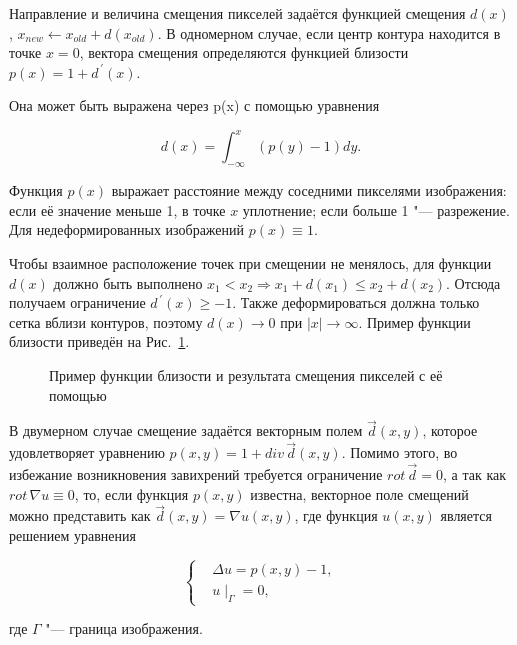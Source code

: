 Направление и величина смещения пикселей задаётся функцией смещения $d\left(x\right)$, $x_{new} \leftarrow x_{old}+d(x_{old})$. В одномерном случае, если центр контура находится в точке $x = 0$, вектора смещения определяются функцией близости $p\left(x\right)=1+d^{\,\prime}(x)$.

Она может быть выражена через p(x) с помощью уравнения

\begin{equation*}
	d\left(x\right)=\int_{-\infty}^{x}\left(p\left(y\right)-1\right)dy.
\end{equation*}

Функция $p(x)$ выражает расстояние между соседними пикселями изображения: если её значение меньше 1, в точке $x$ уплотнение; если больше 1 "--- разрежение. Для недеформированных изображений $p(x)\equiv1$.

Чтобы взаимное расположение точек при смещении не менялось, для функции $d(x)$ должно быть выполнено $x_1<x_2 \Rightarrow x_1+d(x_1)\le x_2+d(x_2)$. Отсюда получаем ограничение $d^{\,\prime}\left(x\right)\geq-1$. Также деформироваться должна только сетка вблизи контуров, поэтому $d\left(x\right)\rightarrow0$ при  $\left|x\right|\rightarrow\infty$. Пример функции близости приведён на Рис.~\ref{fig:warping-proximity}.

\begin{figure}[ht]
	\caption{Пример функции близости и результата смещения пикселей с её помощью}
	\label{fig:warping-proximity}
\end{figure}

В двумерном случае смещение задаётся векторным полем $\vec{d}(x,y)$, которое удовлетворяет уравнению $p\left(x,y\right)=1+div\,\vec{d}(x,y)$. Помимо этого, во избежание возникновения завихрений требуется ограничение $rot\, \vec{d}=0$, а так как $rot\, \nabla u \equiv 0$, то, если функция $p(x, y)$ известна, векторное поле смещений можно представить как $\vec{d}\left(x,y\right)=\nabla u\left(x,y\right)$, где функция $u\left(x,y\right)$ является решением уравнения

\begin{equation*}
	\left\{
		\begin{aligned}
			&\Delta u = p\left(x,y\right) - 1, \\
			&u\mid_\Gamma=0,
		\end{aligned}
	\right.
\end{equation*}

\noindent где $\Gamma$ "--- граница изображения.

